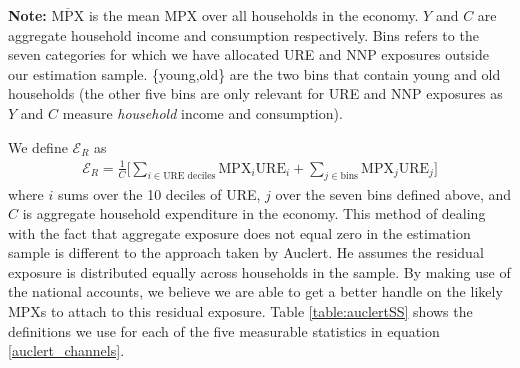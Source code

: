 \documentclass[titlepage]{\econtex}\newcommand{\texname}{ConsumptionHeterogeneity}
\begin{document}
\begin{minipage}{1.0\textwidth}
	\begin{center}
		\label{table:auclertSS}
	\end{center}
	\tiny \textbf{Note: } $\overline{\text{MPX}}$ is the mean MPX over all households in the economy. $Y$ and $C$ are aggregate household income and consumption respectively. Bins refers to the seven categories for which we have allocated URE and NNP exposures outside our estimation sample. \{young,old\} are the two bins that contain young and old households (the other five bins are only relevant for URE and NNP exposures as $Y$ and $C$ measure \textit{household} income and consumption).\\
\end{minipage}


We define $\mathcal{E}_R$ as
\begin{align}
\mathcal{E}_R = \frac{1}{C}\Bigg[ \sum_{i \in \text{URE deciles} } \text{MPX}_i \text{URE}_i + \sum_{j \in \text{bins}} \text{MPX}_j \text{URE}_j \Bigg]
\end{align}
where $i$ sums over the 10 deciles of URE, $j$ over the seven bins defined above, and $C$ is aggregate household expenditure in the economy. This method of dealing with the fact that aggregate exposure does not equal zero in the estimation sample is different to the approach taken by Auclert. He assumes the residual exposure is distributed equally across households in the sample. By making use of the national accounts, we believe we are able to get a better handle on the likely MPXs to attach to this residual exposure. Table \ref{table:auclertSS} shows the definitions we use for each of the five measurable statistics in equation \ref{auclert_channels}.
\end{document}
